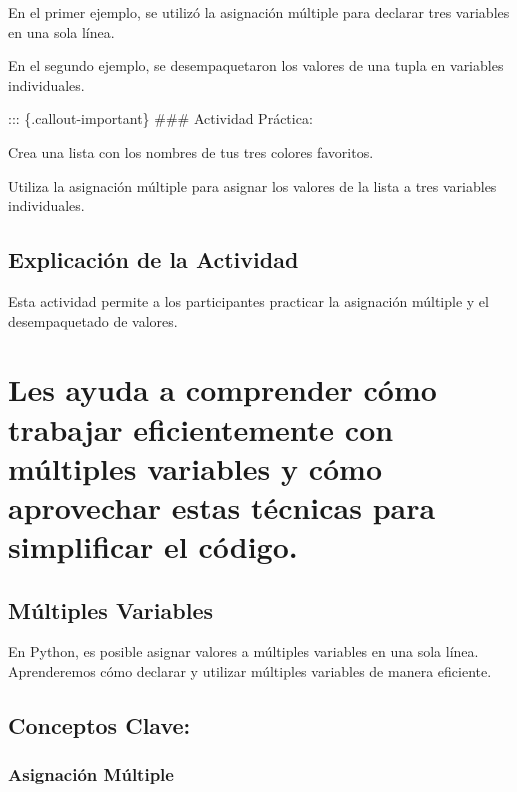 \documentclass[
  a4paper,
  onepage,
  openany]{scrreprt}
\begin{document}
En el primer ejemplo, se utilizó la asignación múltiple para declarar
tres variables en una sola línea.

En el segundo ejemplo, se desempaquetaron los valores de una tupla en
variables individuales.

::: \{.callout-important\} \#\#\# Actividad Práctica:

Crea una lista con los nombres de tus tres colores favoritos.

Utiliza la asignación múltiple para asignar los valores de la lista a
tres variables individuales.

\hypertarget{explicaciuxf3n-de-la-actividad-10}{%
\section{Explicación de la
Actividad}\label{explicaciuxf3n-de-la-actividad-10}}

Esta actividad permite a los participantes practicar la asignación
múltiple y el desempaquetado de valores.

\hypertarget{les-ayuda-a-comprender-cuxf3mo-trabajar-eficientemente-con-muxfaltiples-variables-y-cuxf3mo-aprovechar-estas-tuxe9cnicas-para-simplificar-el-cuxf3digo.}{%
\chapter{Les ayuda a comprender cómo trabajar eficientemente con
múltiples variables y cómo aprovechar estas técnicas para simplificar el
código.}\label{les-ayuda-a-comprender-cuxf3mo-trabajar-eficientemente-con-muxfaltiples-variables-y-cuxf3mo-aprovechar-estas-tuxe9cnicas-para-simplificar-el-cuxf3digo.}}

\hypertarget{muxfaltiples-variables-1}{%
\section{Múltiples Variables}\label{muxfaltiples-variables-1}}

En Python, es posible asignar valores a múltiples variables en una sola
línea. Aprenderemos cómo declarar y utilizar múltiples variables de
manera eficiente.

\hypertarget{conceptos-clave-13}{%
\section{Conceptos Clave:}\label{conceptos-clave-13}}

\hypertarget{asignaciuxf3n-muxfaltiple-1}{%
\subsection{Asignación Múltiple}\label{asignaciuxf3n-muxfaltiple-1}}
\end{document}
